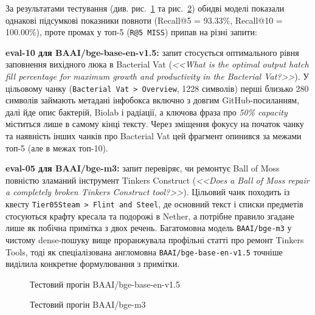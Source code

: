 За результатами тестування (див. рис.~\ref{fig:eval-bge-v15} та рис.~\ref{fig:eval-bge-v3}) обидві моделі показали однакові підсумкові показники повноти (Recall@5 = 93.33\%, Recall@10 = 100.00\%), проте промах у топ-5 (\texttt{R@5 MISS}) припав на різні запити:
\begin{dashlist}[wide]
    \item \textbf{eval-10 для BAAI/bge-base-en-v1.5:} запит стосується оптимального рівня заповнення вихідного люка в Bacterial Vat (\textit{<<What is the optimal output hatch fill percentage for maximum growth and productivity in the Bacterial Vat?>>}). У цільовому чанку (\texttt{Bacterial Vat > Overview}, 1228 символів) перші близько 280 символів займають метадані інфобокса включно з довгим GitHub-посиланням, далі йде опис бактерій, Biolab і радіації, а ключова фраза про \textit{50\% capacity} міститься лише в самому кінці тексту. Через зміщення фокусу на початок чанку та наявність інших чанків про Bacterial Vat цей фрагмент опинився за межами топ-5 (але в межах топ-10).
    \item \textbf{eval-05 для BAAI/bge-m3:} запит перевіряє, чи ремонтує Ball of Moss повністю зламаний інструмент Tinkers Construct (\textit{<<Does a Ball of Moss repair a completely broken Tinkers Construct tool?>>}). Цільовий чанк походить із квесту \texttt{Tier05Steam > Flint and Steel}, де основний текст і списки предметів стосуються крафту кресала та подорожі в Nether, а потрібне правило згадане лише як побічна примітка з двох речень. Багатомовна модель \texttt{BAAI/bge-m3} у чистому dense-пошуку вище проранжувала профільні статті про ремонт Tinkers Tools, тоді як спеціалізована англомовна \texttt{BAAI/bge-base-en-v1.5} точніше виділила конкретне формулювання з примітки.
\end{dashlist}

\begin{figure}[H]
    \centering
    \caption{Тестовий прогін BAAI/bge-base-en-v1.5}
    \label{fig:eval-bge-v15}
\end{figure}

\begin{figure}[H]
    \centering
    \caption{Тестовий прогін BAAI/bge-m3}
    \label{fig:eval-bge-v3}
\end{figure}